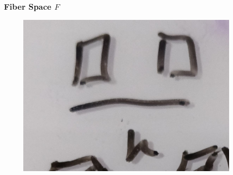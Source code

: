 \documentclass[../main.tex]{subfiles}
\begin{document}
\subsubsection{Fiber Space $F$}
\begin{figure}
    \includegraphics{figures/sections/math/temp_2f.png}
    \label{fig:}
\end{figure}
\end{document}
